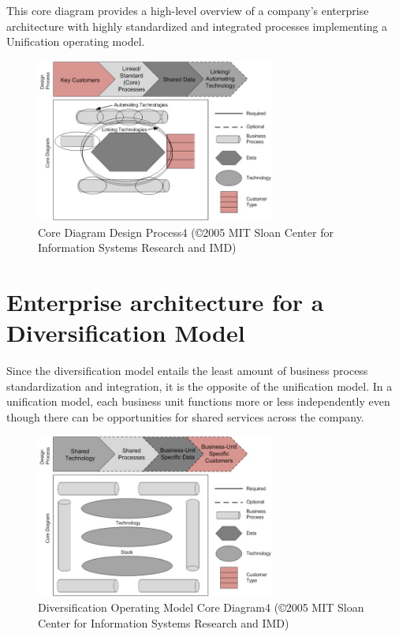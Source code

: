 This core diagram provides a high-level overview of a company's enterprise architecture with highly standardized and
integrated processes implementing a Unification operating model.

\begin{figure}[ht]
    \centering
    \includegraphics[width=0.7\textwidth]{../images/core-diagram-design-process4.jpg}
    \caption{Core Diagram Design Process4 (©2005 MIT Sloan Center for Information Systems Research and IMD)}
    \label{fig:ekgmm-ea-core-diagram-design-process4}
\end{figure}

\section*{Enterprise architecture for a Diversification Model}

Since the diversification model entails the least amount of business process standardization and integration,
it is the opposite of the unification model.
In a unification model, each business unit functions more or less independently even though there can be opportunities
for shared services across the company.

\begin{figure}[ht]
    \centering
    \includegraphics[width=0.7\textwidth]{../images/diversification-operating-model-core-diagram4.jpg}
    \caption{Diversification Operating Model Core Diagram4 (©2005 MIT Sloan Center for Information Systems Research and IMD)}
    \label{fig:ekgmm-ea-diversification-operating-model-core-diagram4}
\end{figure}

